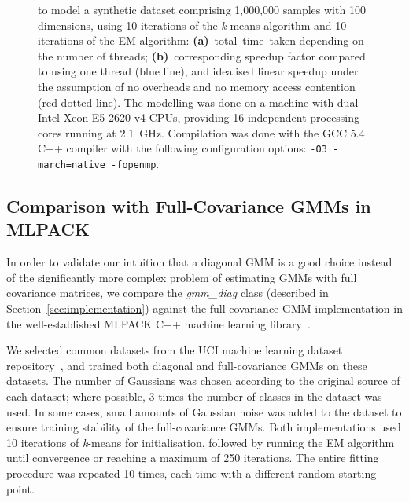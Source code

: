 \documentclass[10pt,a4paper]{article}
\begin{document}
\begin{figure}[!b]
{  to model a synthetic dataset comprising 1,000,000 samples with 100 dimensions,
  using 10 iterations of the {\it k}-means algorithm and 10 iterations of the EM algorithm:
  {\bf (a)}~total~time~taken depending on the number of threads;
  {\bf (b)}~corresponding speedup factor compared to using one thread (blue line), and idealised linear speedup under the assumption of no overheads and no memory access contention (red dotted line).
  The modelling was done on a machine with dual Intel Xeon E5-2620-v4 CPUs, providing 16 independent processing cores running at 2.1~GHz.
  Compilation was done with the GCC 5.4 C++ compiler with the following configuration options: \texttt{-O3 -march=native -fopenmp}.
  }
\label{fig:speedup}
\end{figure}



\subsection{Comparison with Full-Covariance GMMs in MLPACK}

In order to validate our intuition that a diagonal GMM is a good choice instead
of the significantly more complex problem of estimating GMMs with full covariance matrices,
we compare the {\it gmm\_diag} class (described in Section~\ref{sec:implementation})
against the full-covariance GMM implementation in the well-established MLPACK C++ machine learning library~\cite{Curtin_2013}.

We selected common datasets from the UCI machine learning dataset repository~\cite{Lichman_2013},
and trained both diagonal and full-covariance GMMs on these datasets.
The number of Gaussians was chosen according to the original source of each dataset;
where possible, 3 times the number of classes in the dataset was used.
In some cases, small amounts of Gaussian noise was added to the dataset to ensure
training stability of the full-covariance GMMs.
Both implementations used 10 iterations of {\it k}-means for initialisation,
followed by running the EM algorithm until convergence or reaching a maximum of 250 iterations.
The entire fitting procedure was repeated 10 times, each time with a different random starting point.
\end{document}
